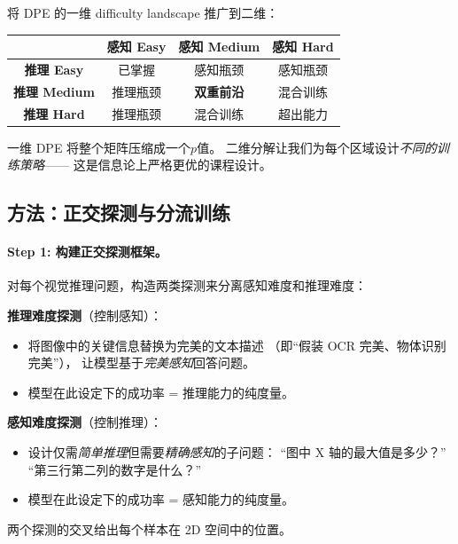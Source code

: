 \documentclass[12pt,a4paper]{article}
\begin{document}
\begin{insightbox}
将 DPE 的一维 difficulty landscape 推广到二维：

\begin{center}
\begin{tabular}{c|c|c|c}
 & \textbf{感知 Easy} & \textbf{感知 Medium} & \textbf{感知 Hard} \\
\hline
\textbf{推理 Easy} & 已掌握 & 感知瓶颈 & 感知瓶颈 \\
\hline
\textbf{推理 Medium} & 推理瓶颈 & \textbf{双重前沿} & 混合训练 \\
\hline
\textbf{推理 Hard} & 推理瓶颈 & 混合训练 & 超出能力 \\
\end{tabular}
\end{center}

\noindent
一维 DPE 将整个矩阵压缩成一个$p$值。
二维分解让我们为每个区域设计\textit{不同的训练策略}——
这是信息论上严格更优的课程设计。
\end{insightbox}

\subsection{方法：正交探测与分流训练}

\paragraph{Step 1: 构建正交探测框架。}

对每个视觉推理问题，构造两类探测来分离感知难度和推理难度：

\textbf{推理难度探测}（控制感知）：
\begin{itemize}[leftmargin=2em]
  \item 将图像中的关键信息替换为完美的文本描述
    （即``假装 OCR 完美、物体识别完美''），
    让模型基于\textit{完美感知}回答问题。
  \item 模型在此设定下的成功率 = 推理能力的纯度量。
\end{itemize}

\textbf{感知难度探测}（控制推理）：
\begin{itemize}[leftmargin=2em]
  \item 设计仅需\textit{简单推理}但需要\textit{精确感知}的子问题：
    ``图中 X 轴的最大值是多少？''
    ``第三行第二列的数字是什么？''
  \item 模型在此设定下的成功率 = 感知能力的纯度量。
\end{itemize}

\noindent
两个探测的交叉给出每个样本在 2D 空间中的位置。
\end{document}
